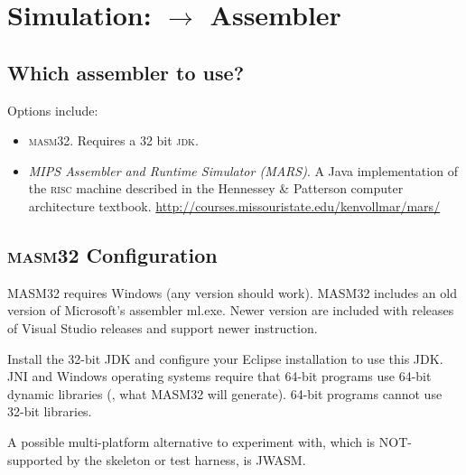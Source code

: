 \chapter{Simulation: \F $\rightarrow$ Assembler}


\section{Which assembler to use?}

Options include:

\begin{itemize}

    \item \textsc{masm32}. Requires a 32 bit \textsc{jdk}.

    \item \emph{MIPS Assembler and Runtime Simulator (MARS)}. A Java
    implementation of the \textsc{risc} machine described in the
    Hennessey \& Patterson computer architecture textbook.
    \url{http://courses.missouristate.edu/kenvollmar/mars/}

\end{itemize}

\section{\textsc{masm32} Configuration}

\biTight

\item MASM32 requires Windows (any version should work). MASM32 includes an old version of Microsoft's assembler ml.exe. Newer version are included with releases of Visual Studio releases and support newer instruction.

\item Install the 32-bit JDK and configure your Eclipse installation to use this JDK. JNI and Windows operating systems require that 64-bit programs use 64-bit dynamic libraries (\ie, what MASM32 will generate). 64-bit programs cannot use 32-bit libraries. 

\item A possible multi-platform alternative to experiment with, which is NOT-supported by the skeleton or test harness, is JWASM.

